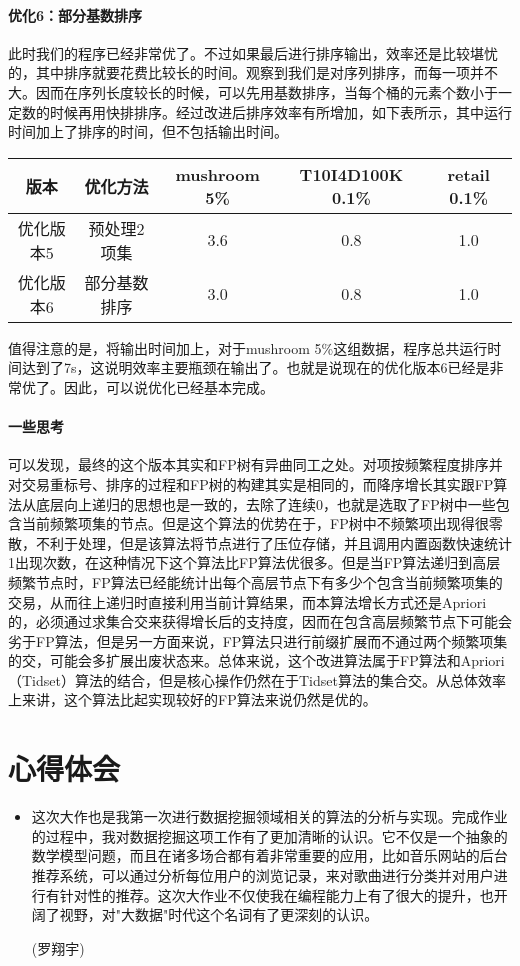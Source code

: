 \documentclass[a4paper,9pt]{article}
\begin{document}
\paragraph{优化6：部分基数排序} 此时我们的程序已经非常优了。不过如果最后进行排序输出，效率还是比较堪忧的，其中排序就要花费比较长的时间。观察到我们是对序列排序，而每一项并不大。因而在序列长度较长的时候，可以先用基数排序，当每个桶的元素个数小于一定数的时候再用快排排序。经过改进后排序效率有所增加，如下表所示，其中运行时间加上了排序的时间，但不包括输出时间。
\begin{center}
	\begin{tabular}{ccccc}
		版本&优化方法&mushroom 5\%&T10I4D100K 0.1\%&retail 0.1\%\\\hline
		优化版本5&预处理2项集&3.6&0.8&1.0\\
		优化版本6&部分基数排序&3.0&0.8&1.0
	\end{tabular}
\end{center}
值得注意的是，将输出时间加上，对于mushroom 5\%这组数据，程序总共运行时间达到了7s，这说明效率主要瓶颈在输出了。也就是说现在的优化版本6已经是非常优了。因此，可以说优化已经基本完成。

\paragraph{一些思考} 可以发现，最终的这个版本其实和FP树有异曲同工之处。对项按频繁程度排序并对交易重标号、排序的过程和FP树的构建其实是相同的，而降序增长其实跟FP算法从底层向上递归的思想也是一致的，去除了连续0，也就是选取了FP树中一些包含当前频繁项集的节点。但是这个算法的优势在于，FP树中不频繁项出现得很零散，不利于处理，但是该算法将节点进行了压位存储，并且调用内置函数快速统计1出现次数，在这种情况下这个算法比FP算法优很多。但是当FP算法递归到高层频繁节点时，FP算法已经能统计出每个高层节点下有多少个包含当前频繁项集的交易，从而往上递归时直接利用当前计算结果，而本算法增长方式还是Apriori的，必须通过求集合交来获得增长后的支持度，因而在包含高层频繁节点下可能会劣于FP算法，但是另一方面来说，FP算法只进行前缀扩展而不通过两个频繁项集的交，可能会多扩展出废状态来。总体来说，这个改进算法属于FP算法和Apriori（Tidset）算法的结合，但是核心操作仍然在于Tidset算法的集合交。从总体效率上来讲，这个算法比起实现较好的FP算法来说仍然是优的。

\section{心得体会}

\begin{itemize}
	\item{} 这次大作也是我第一次进行数据挖掘领域相关的算法的分析与实现。完成作业的过程中，我对数据挖掘这项工作有了更加清晰的认识。它不仅是一个抽象的数学模型问题，而且在诸多场合都有着非常重要的应用，比如音乐网站的后台推荐系统，可以通过分析每位用户的浏览记录，来对歌曲进行分类并对用户进行有针对性的推荐。这次大作业不仅使我在编程能力上有了很大的提升，也开阔了视野，对"大数据"时代这个名词有了更深刻的认识。

		(罗翔宇)
\end{itemize}
\end{document}
